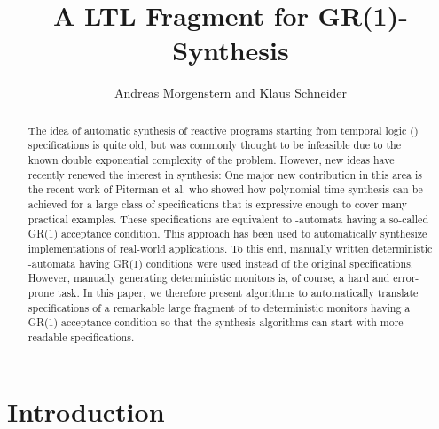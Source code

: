 \documentclass[submission,copyright,creativecommons]{eptcs}
\begin{document}
\title{A LTL Fragment for GR(1)-Synthesis}

\author{Andreas Morgenstern and Klaus Schneider
}
\def\titlerunning{A LTL Fragment for GR(1)-Synthesis}

\def\authorrunning{A. Morgenstern and K. Schneider}

\newtheorem{definition}{Definition}
\newtheorem{proposition}{Proposition}
\newtheorem{lemma}{Lemma}
\newtheorem{theorem}{Theorem}
\newtheorem{corollary}{Corollary}
\newtheorem{remark}{Remark}
\newtheorem{example}{Example}
\def\qed{\hfill \rule{2mm}{2mm}}


\maketitle

\begin{abstract}
The idea of automatic synthesis of reactive programs starting from temporal logic (\LTL{}) specifications is quite old, but was commonly thought to be infeasible due to the known double exponential complexity of the problem. However, new ideas have recently renewed the interest in \LTL{} synthesis: One major new contribution in this area is the recent work of Piterman et al. who showed how polynomial time synthesis can be achieved for a large class of \LTL{} specifications that is expressive enough to cover many practical examples. These \LTL{} specifications are equivalent to -automata having a so-called GR(1) acceptance condition. This approach has been used to automatically synthesize implementations of real-world applications. To this end, manually written deterministic -automata having GR(1) conditions were used instead of the original \LTL{} specifications. However, manually generating deterministic monitors is, of course, a hard and error-prone task. In this paper, we therefore present algorithms to automatically translate specifications of a remarkable large fragment of \LTL{} to deterministic monitors having a GR(1) acceptance condition so that the synthesis algorithms can start with more readable \LTL{} specifications.
\end{abstract}


\section{Introduction}
\end{document}
